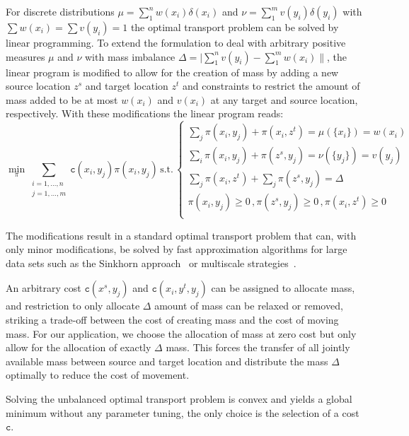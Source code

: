 \documentclass{llncs}
\newcommand{\cost}[0]{\mathtt{c}}
\newcommand{\coupling}[0]{\pi}
\begin{document}
For discrete distributions $\mu = \sum_1^n w(x_i) \delta(x_i)$ and $ \nu =
\sum_1^m v(y_i) \delta(y_i)$ with $\sum w(x_i) = \sum v(y_i) = 1$ the optimal
transport problem can be solved by linear programming. To extend the
formulation to deal with arbitrary positive measures $\mu$ and $\nu$ with mass
imbalance  $\Delta = \lvert \sum_1^n v(y_i)  - \sum_1^m w(x_i) \rVert$, the
linear program is modified to allow for the creation of mass by adding a new
source location $z^s$ and target location $z^t$ and constraints to restrict the
amount of mass added to be at most $w(x_i)$ and $v(x_i)$ at any target and
source location, respectively. With these modifications the linear program reads: 
\begin{equation}
\min_\coupling \sum_{\substack{i=1,\dots,n\\ j=1,\dots,m}} 
      \cost(x_i, y_j) \coupling(x_i, y_j) \, \text{s.t.}\, 
\begin{cases}
  \sum_j \coupling(x_i, y_j) + \coupling(x_i, z^t) = \mu(\{x_i\}) = w(x_i) & \\ 
  \sum_i \coupling(x_i, y_j) + \coupling(z^s, y_j) = \nu(\{y_j\}) = v(y_j) & \\
  \sum_j \coupling(x_i, z^t) + \sum_j \coupling(z^s, y_j)  = \Delta \\
  \coupling(x_i, y_j) \ge 0 \,, \coupling(z^s, y_j) \ge 0 \,, \coupling(x_i,
  z^t) \ge 0  \\
\end{cases}
\label{eq:unbalanced}
\end{equation} 

The modifications result in a standard optimal transport problem that can, with
only minor modifications, be solved by fast approximation algorithms for large
data sets such as the Sinkhorn approach~\cite{cuturi2013sinkhorn} or multiscale
strategies~\cite{gerber2017multiscale}. 

An arbitrary cost $\cost(x^s, y_j)$ and  $\cost(x_i, y^t, y_j)$ can be assigned
to allocate mass, and restriction to only allocate $\Delta$ amount of mass can
be relaxed or removed, striking a trade-off between the cost of creating mass
and the cost of moving mass. For our application, we choose the allocation of
mass at zero cost but only allow for the allocation of exactly $\Delta$ mass.
This forces the transfer of all jointly available mass between source and
target location and distribute the mass $\Delta$ optimally to reduce the cost
of movement.

Solving the unbalanced optimal transport problem is convex and yields a global
minimum without any parameter tuning, the only choice is the selection of a
cost $\cost$.
\end{document}

